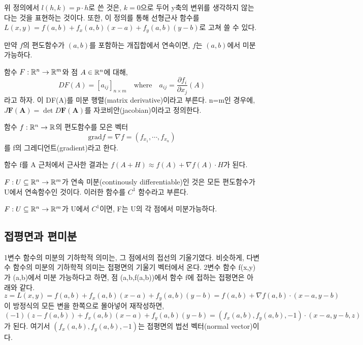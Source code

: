 위 정의에서 $l(h,k)=p \cdot h$로 쓴 것은, $k=0$으로 두어 y축의 변위를 생각하지 않는다는 것을 표현하는 것이다. 또한, 이 정의를 통해 선형근사 함수를 $L(x,y)=f(a,b)+f_x(a,b)(x-a)+f_y(a,b)(y-b)$로 고쳐 쓸 수 있다.

\begin{theorem}
만약 $f$의 편도함수가 $(a,b)$를 포함하는 개집합에서 연속이면, $f$는 $(a,b)$에서 미분가능하다.
\end{theorem}

\begin{definition}[자코비안]
함수 $F: \mathbb{R}^n \to \mathbb{R}^m$와 점 $A \in \mathbb{R}^n$에 대해,
$$
DF(A)=[a_{ij}]_{n \times m}\quad\text{where}\quad a_{ij}=\frac{\partial f_i}{\partial x_j}(A)
$$
라고 하자. 이 DF(A)를 미분 행렬(matrix derivative)이라고 부른다. n=m인 경우에, $J\textbf{F}(\textbf{A}) = \det D \textbf{F}(\textbf{A})$를 자코비안(jacobian)이라고 정의한다.
\end{definition}

\begin{definition}[그레디언트]
함수 $f: \mathbb{R}^n \to \mathbb{R}$의 편도함수를 모은 벡터
$$\text{grad} f = \nabla f = (f_{x_1}, \cdots, f_{x_n})$$
를 f의 그레디언트(gradient)라고 한다.
\end{definition}

함수 f를 A 근처에서 근사한 결과는 $f(A+H) \approx f(A) + \nabla f(A) \cdot H$가 된다.

\begin{definition}[연속 미분성]
$F: U \subseteq \mathbb{R}^n \to \mathbb{R}^m$가 연속 미분(continously differentiable)인 것은 모든 편도함수가 U에서 연속함수인 것이다. 이러한 함수를 $C^1$ 함수라고 부른다.
\end{definition}

\begin{theorem}
$F: U \subseteq \mathbb{R}^n \to \mathbb{R}^m$가 U에서 $C^1$이면, F는 U의 각 점에서 미분가능하다.
\end{theorem}

\subsection{접평면과 편미분}
1변수 함수의 미분의 기하학적 의미는, 그 점에서의 접선의 기울기였다. 비슷하게, 다변수 함수의 미분의 기하학적 의미는 접평면의 기울기 벡터에서 온다. 2변수 함수 f(x,y)가 (a,b)에서 미분 가능하다고 하면, 점 (a,b,f(a,b))에서 함수 f에 접하는 접평면은 아래와 같다.
$$
z=L(x,y)=f(a,b)+f_x(a,b)(x-a)+f_y(a,b)(y-b)=f(a,b)+\nabla f(a,b) \cdot (x-a,y-b)
$$
이 방정식의 모든 변을 한쪽으로 몰아넣어 재작성하면,
$$
(-1)(z-f(a,b))+f_x(a,b)(x-a)+f_y(a,b)(y-b)=(f_x(a,b),f_y(a,b),-1) \cdot (x-a,y-b,z)
$$
가 된다. 여기서 $(f_x(a,b),f_y(a,b),-1)$는 접평면의 법선 벡터(normal vector)이다.

